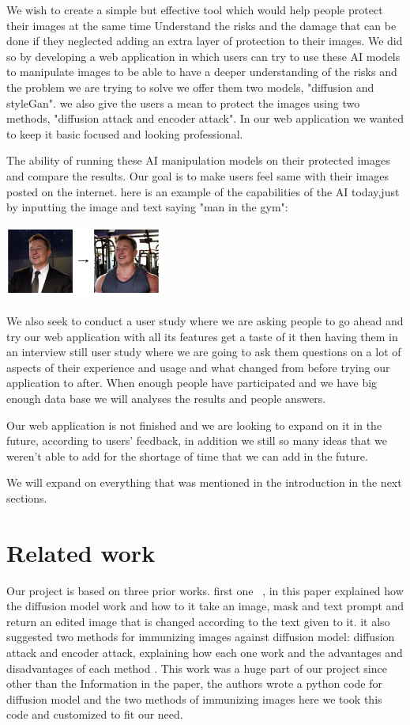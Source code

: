 \documentclass[sigconf]{acmart}
\begin{document}
We wish to create a simple but effective tool which would help people protect their images  at the same time Understand the risks and the damage that can be done if they neglected adding an extra layer of protection to their images. We did so by developing a web application in which users can try to use these AI models to manipulate images to be able to have a deeper understanding of the risks and the problem we are trying to solve we offer them two models, "diffusion and styleGan". we also give the users a mean to protect the images using two methods, "diffusion attack and encoder attack". In our web application we wanted to keep it basic focused and looking professional. 

The ability of running these AI manipulation models on their protected images and compare the results. Our goal is to make users feel same with their images posted on the internet.
here is an example of the capabilities of the AI today,just by inputting the image and text saying "man in the gym":

\includegraphics[width=0.4\textwidth]{exmple1}

We also seek to conduct a user study where we are asking people to go ahead and try our web application with all its features get a taste of it then having them in an interview still user study where we are going to ask them questions on a lot of aspects of their experience and usage and what changed from before trying our application to after. When enough people have participated and we have big enough data base we will analyses the results and people answers.      

Our web application is not finished and we are looking to expand on it in the future, according to users' feedback, in addition we still so many ideas that we weren't able to add for the shortage of time that we can add in the future.

We will expand on everything that was mentioned in the introduction in the next sections.     

\section{Related work}

Our project is based on three prior works. first one ~\cite{a}, in this paper explained how the diffusion model work and how to it take an image, mask and text prompt and return an edited image that is changed according to the text given to it. it also suggested two methods for immunizing images against diffusion model: diffusion attack and encoder attack, explaining how each one work and the advantages and disadvantages of each method . This work was a huge part of our project since other than the Information in the paper, the authors wrote a python code for diffusion model and the two methods of immunizing images here we took this code and customized to fit our need. 
\end{document}
